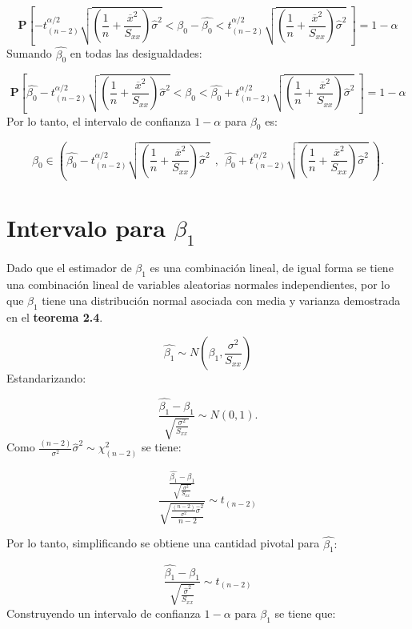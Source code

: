 \documentclass[
  a4paper,
  oneside,
  openany]{book}
\begin{document}
\[\mathbf{P}\left[-t^{\alpha/2}_{(n-2)}\sqrt{\left(\frac{1}{n}+\frac{\overline{x}^2}{S_{xx}}\right)\hat{\sigma}^2}<\beta_{0}-\hat{\beta_{0}}< t^{\alpha/2}_{(n-2)}\sqrt{\left(\frac{1}{n}+\frac{\overline{x}^2}{S_{xx}}\right)\hat{\sigma}^2} \ \right]=1-\alpha\]
Sumando \(\hat{\beta_{0}}\) en todas las desigualdades:

\[\mathbf{P}\left[\hat{\beta_{0}}-t^{\alpha/2}_{(n-2)}\sqrt{\left(\frac{1}{n}+\frac{\overline{x}^2}{S_{xx}}\right)\hat{\sigma}^2}<\beta_{0}< \hat{\beta_{0}}+t^{\alpha/2}_{(n-2)}\sqrt{\left(\frac{1}{n}+\frac{\overline{x}^2}{S_{xx}}\right)\hat{\sigma}^2} \ \right]=1-\alpha\]
Por lo tanto, el intervalo de confianza \(1-\alpha\) para \(\beta_{0}\) es:

\[\beta_{0} \in \left( \hat{\beta_{0}}-t^{\alpha/2}_{(n-2)}\sqrt{\left(\frac{1}{n}+\frac{\overline{x}^2}{S_{xx}}\right)\hat{\sigma}^2} \ \ , \ \ \hat{\beta_{0}}+t^{\alpha/2}_{(n-2)}\sqrt{\left(\frac{1}{n}+\frac{\overline{x}^2}{S_{xx}}\right)\hat{\sigma}^2} \  \right).\]

\hypertarget{intervalo-para-beta_1}{%
\section{\texorpdfstring{Intervalo para \(\beta_{1}\)}{Intervalo para \textbackslash beta\_\{1\}}}\label{intervalo-para-beta_1}}

Dado que el estimador de \(\beta_{1}\) es una combinación lineal, de igual forma se tiene una combinación lineal de variables aleatorias normales independientes, por lo que \(\beta_{1}\) tiene una distribución normal asociada con media y varianza demostrada en el \textbf{teorema 2.4}.

\[\hat{\beta_{1}}\sim N \left(\beta_{1},\frac{\sigma^2}{S_{xx}}\right)\]
Estandarizando:

\[\frac{\hat{\beta_{1}}-\beta_{1}}{\sqrt{\frac{\sigma^2}{S_{xx}}}}\sim N(0,1).\]
Como \(\frac{(n-2)}{\sigma^2}\hat{\sigma}^2\sim\chi^2_{(n-2)}\) se tiene:

\[\frac{\frac{\hat{\beta_{1}}-\beta_{1}}{\sqrt{\frac{\sigma^2}{S_{xx}}}}}{\sqrt{\frac{\frac{(n-2)}{\sigma^2}\hat{\sigma}^2}{n-2}}} \sim t_{(n-2)}\]

Por lo tanto, simplificando se obtiene una cantidad pivotal para \(\hat{\beta_{1}}:\)

\[\frac{\hat{\beta_{1}}-\beta_{1}}{\sqrt{\frac{\hat{\sigma}^2}{S_{xx}}}}\sim t_{(n-2)}\]
Construyendo un intervalo de confianza \(1-\alpha\) para \(\beta_{1}\) se tiene que:
\end{document}
